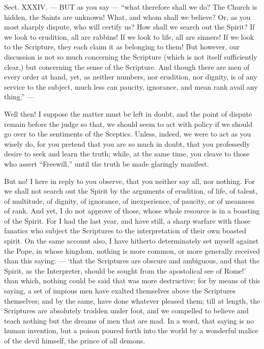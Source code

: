 
Sect. XXXIV. — BUT as you say — “what therefore shall we do? The Church is hidden, the Saints are unknown! What, and whom shall we believe? Or, as you most sharply dispute, who will certify us? How shall we search out the Spirit? If we look to erudition, all are rabbins! If we look to life, all are sinners! If we look to the Scripture, they each claim it as belonging to them! But however, our discussion is not so much concerning the Scripture (which is not itself sufficiently clear,) but concerning the sense of the Scripture. And though there are men of every order at hand, yet, as neither numbers, nor erudition, nor dignity, is of any service to the subject, much less can paucity, ignorance, and mean rank avail any thing.” —

Well then! I suppose the matter must be left in doubt, and the point of dispute remain before the judge so that, we should seem to act with policy if we should go over to the sentiments of the Sceptics. Unless, indeed, we were to act as you wisely do, for you pretend that you are so much in doubt, that you professedly desire to seek and learn the truth; while, at the same time, you cleave to those who assert “Freewill,” until the truth be made glaringly manifest.

But no! I here in reply to you observe, that you neither say all, nor nothing. For we shall not search out the Spirit by the arguments of erudition, of life, of talent, of multitude, of dignity, of ignorance, of inexperience, of paucity, or of meanness of rank. And yet, I do not approve of those, whose whole resource is in a boasting of the Spirit. For I had the last year, and have still, a sharp warfare with those fanatics who subject the Scriptures to the interpretation of their own boasted spirit. On the same account also, I have hitherto determinately set myself against the Pope, in whose kingdom, nothing is more common, or more generally received than this saying: — ‘that the Scriptures are obscure and ambiguous, and that the Spirit, as the Interpreter, should be sought from the apostolical see of Rome!’ than which, nothing could be said that was more destructive; for by means of this saying, a set of impious men have exalted themselves above the Scriptures themselves; and by the same, have done whatever pleased them; till at length, the Scriptures are absolutely trodden under foot, and we compelled to believe and teach nothing but the dreams of men that are mad. In a word, that saying is no human invention, but a poison poured forth into the world by a wonderful malice of the devil himself, the prince of all demons.

